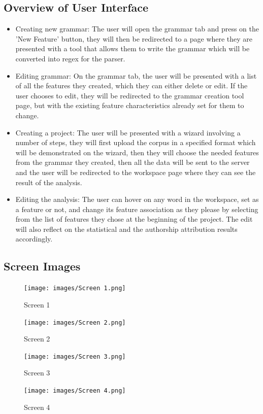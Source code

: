 \subsection {Overview of User Interface}
\begin{itemize}
    \item Creating new grammar: The user will open the grammar tab and press on the 'New Feature' button, they will then be redirected to a page where they are presented with a tool that allows them to write the grammar which will be converted into regex for the parser.
    \item Editing grammar: On the grammar tab, the user will be presented with a list of all the features they created, which they can either delete or edit. If the user chooses to edit, they will be redirected to the grammar creation tool page, but with the existing feature characteristics already set for them to change.
    \item Creating a project: The user will be presented with a wizard involving a number of steps, they will first upload the corpus in a specified format which will be demonstrated on the wizard, then they will choose the needed features from the grammar they created, then all the data will be sent to the server and the user will be redirected to the workspace page where they can see the result of the analysis.
    \item Editing the analysis: The user can hover on any word in the workspace, set as a feature or not, and change its feature association as they please by selecting from the list of features they chose at the beginning of the project. The edit will also reflect on the statistical and the authorship attribution results accordingly.
\end{itemize}

\subsection {Screen Images}
\begin{figure}[H]
    \texttt{[image: images/Screen 1.png]}
    \caption{Screen 1}
\end{figure}

\begin{figure}[H]
    \texttt{[image: images/Screen 2.png]}
    \caption{Screen 2}
\end{figure}

\begin{figure}[H]
    \texttt{[image: images/Screen 3.png]}
    \caption{Screen 3}
\end{figure}
\begin{figure}[H]
    \texttt{[image: images/Screen 4.png]}
    \caption{Screen 4}
\end{figure}


